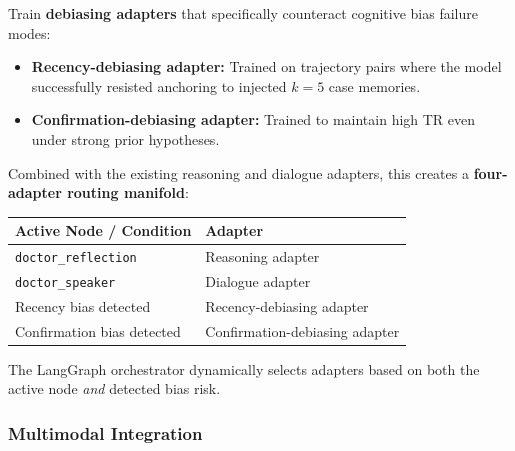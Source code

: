 \begin{acadbox}[\textcolor{white}{Academic Definition}]
Train \textbf{debiasing adapters} that specifically counteract cognitive bias failure modes:
\begin{itemize}
    \item \textbf{Recency-debiasing adapter:} Trained on trajectory pairs where the model successfully resisted anchoring to injected $k=5$ case memories.
    \item \textbf{Confirmation-debiasing adapter:} Trained to maintain high TR even under strong prior hypotheses.
\end{itemize}

Combined with the existing reasoning and dialogue adapters, this creates a \textbf{four-adapter routing manifold}:
\begin{center}
\begin{tabular}{@{}ll@{}}
\toprule
\textbf{Active Node / Condition} & \textbf{Adapter} \\
\midrule
\texttt{doctor\_reflection} & Reasoning adapter \\
\texttt{doctor\_speaker} & Dialogue adapter \\
Recency bias detected & Recency-debiasing adapter \\
Confirmation bias detected & Confirmation-debiasing adapter \\
\bottomrule
\end{tabular}
\end{center}
The LangGraph orchestrator dynamically selects adapters based on both the active node \textit{and} detected bias risk.
\end{acadbox}

\subsubsection{Multimodal Integration}

